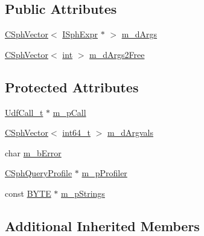 \subsection*{Public Attributes}
\begin{DoxyCompactItemize}
\item 
\hyperlink{classCSphVector}{C\-Sph\-Vector}$<$ \hyperlink{structISphExpr}{I\-Sph\-Expr} $\ast$ $>$ \hyperlink{classExpr__Udf__c_a44490c229e7f366912547c92c17ddf09}{m\-\_\-d\-Args}
\item 
\hyperlink{classCSphVector}{C\-Sph\-Vector}$<$ \hyperlink{sphinxexpr_8cpp_a4a26e8f9cb8b736e0c4cbf4d16de985e}{int} $>$ \hyperlink{classExpr__Udf__c_ad726b861609818b07a4ea61eb9df041d}{m\-\_\-d\-Args2\-Free}
\end{DoxyCompactItemize}
\subsection*{Protected Attributes}
\begin{DoxyCompactItemize}
\item 
\hyperlink{structUdfCall__t}{Udf\-Call\-\_\-t} $\ast$ \hyperlink{classExpr__Udf__c_a28d34f3e5f7bd7b0cf8e61224c807e86}{m\-\_\-p\-Call}
\item 
\hyperlink{classCSphVector}{C\-Sph\-Vector}$<$ \hyperlink{sphinxstd_8h_a996e72f71b11a5bb8b3b7b6936b1516d}{int64\-\_\-t} $>$ \hyperlink{classExpr__Udf__c_a96e3f1c8beab1df306e54fbcaedc4429}{m\-\_\-d\-Argvals}
\item 
char \hyperlink{classExpr__Udf__c_a39a12cdc45355828deaf2227fcd34c5f}{m\-\_\-b\-Error}
\item 
\hyperlink{classCSphQueryProfile}{C\-Sph\-Query\-Profile} $\ast$ \hyperlink{classExpr__Udf__c_acfcfff29850d1fe1f59c9232cd7ecd7e}{m\-\_\-p\-Profiler}
\item 
const \hyperlink{sphinxstd_8h_a4ae1dab0fb4b072a66584546209e7d58}{B\-Y\-T\-E} $\ast$ \hyperlink{classExpr__Udf__c_af0496f9dd34e5cd259cc84285dff57e0}{m\-\_\-p\-Strings}
\end{DoxyCompactItemize}
\subsection*{Additional Inherited Members}


